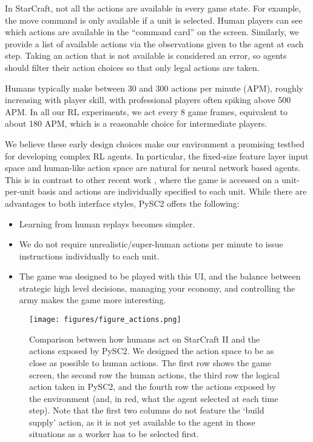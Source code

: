 \documentclass{article}
\begin{document}
In StarCraft, not all the actions are available in every game state. For example, the move command is only available if a unit is selected. Human players can see which actions are available in the ``command card'' on the screen. Similarly, we provide a list of available actions via the observations given to the agent at each step. Taking an action that is not available is considered an error, so agents should filter their action choices so that only legal actions are taken.

Humans typically make between 30 and 300 actions per minute (APM), roughly increasing with player skill, with professional players often spiking above 500 APM. In all our RL experiments, we act every 8 game frames, equivalent to about 180 APM, which is a reasonable choice for intermediate players.

We believe these early design choices make our environment a promising testbed for developing complex RL agents.  In particular, the fixed-size feature layer input space and human-like action space are natural for neural network based agents.  This is in contrast to other recent work \cite{synnaeve2016torchcraft, peng2017multiagent}, where the game is accessed on a unit-per-unit basis and actions are individually specified to each unit.  While there are advantages to both interface styles, PySC2 offers the following:

\begin{itemize}
    \item Learning from human replays becomes simpler.
    \item We do not require unrealistic/super-human actions per minute to issue instructions individually to each unit.
    \item The game was designed to be played with this UI, and the balance between strategic high level decisions, managing your economy, and controlling the army makes the game more interesting.
\end{itemize}

\begin{figure}
    \centering
    \texttt{[image: figures/figure\_actions.png]}
    \caption{Comparison between how humans act on StarCraft II and the actions exposed by PySC2. We designed the action space to be as close as possible to human actions. The first row shows the game screen, the second row the human actions, the third row the logical action taken in PySC2, and the fourth row the actions  exposed by the environment (and, in red, what the agent selected at each time step). Note that the first two columns do not feature the `build supply' action, as it is not yet available to the agent in those situations as a worker has to be selected first.
    }
    \label{fig:actions}
\end{figure}
\end{document}
